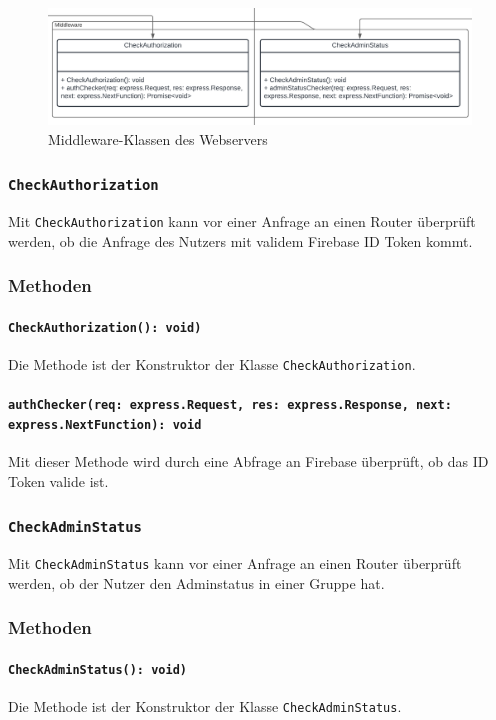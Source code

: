 \documentclass{entwurfsheft}
\begin{document}
\begin{figure}[htp]
    \centering
    \includegraphics[width = 1\textwidth]{images/webserver/middleware.pdf}
    \caption{Middleware-Klassen des Webservers}
    \label{fig:middleware}
\end{figure}

\subsubsection{\texttt{CheckAuthorization}}\label{sec:CheckAuthorization}
Mit \texttt{CheckAuthorization} kann vor einer Anfrage an einen Router überprüft werden, ob die Anfrage des Nutzers mit validem Firebase ID Token kommt. %
\subsubsection*{Methoden}
\paragraph{\texttt{CheckAuthorization(): void)}}
Die Methode ist der Konstruktor der Klasse \texttt{CheckAuthorization}.
\paragraph{\texttt{authChecker(req: express.Request, res: express.Response, next: express.NextFunction): void}}
Mit dieser Methode wird durch eine Abfrage an Firebase überprüft, ob das ID Token valide ist.

\subsubsection{\texttt{CheckAdminStatus}}\label{sec:CheckAdminStatus}
Mit \texttt{CheckAdminStatus} kann vor einer Anfrage an einen Router überprüft werden, ob der Nutzer den Adminstatus in einer Gruppe hat.
\subsubsection*{Methoden}
\paragraph{\texttt{CheckAdminStatus(): void)}}
Die Methode ist der Konstruktor der Klasse \texttt{CheckAdminStatus}.
\end{document}
